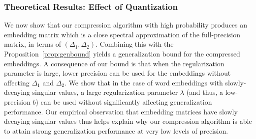 
\subsubsection{Theoretical Results: Effect of Quantization}
\label{sec:theory_results}
We now show that our compression algorithm with high probability produces an embedding matrix which is a close spectral approximation of the full-precision matrix, in terms of $(\Delta_1,\Delta_2)$.
Combining this with the Proposition~\ref{prop:genbound} yields a generalization bound for the compressed embeddings.
A consequence of our bound is that when the regularization parameter is large, lower precision can be used for the embeddings without affecting $\Delta_1$ and $\Delta_2$.
We show that in the case of word embeddings with slowly-decaying singular values, a large regularization parameter $\lambda$ (and thus, a low-precision $b$) can be used without significantly affecting generalization performance.
Our empirical observation that embedding matrices have slowly decaying singular values thus helps explain why our compression algorithm is able to attain strong generalization performance at very low levels of precision.

